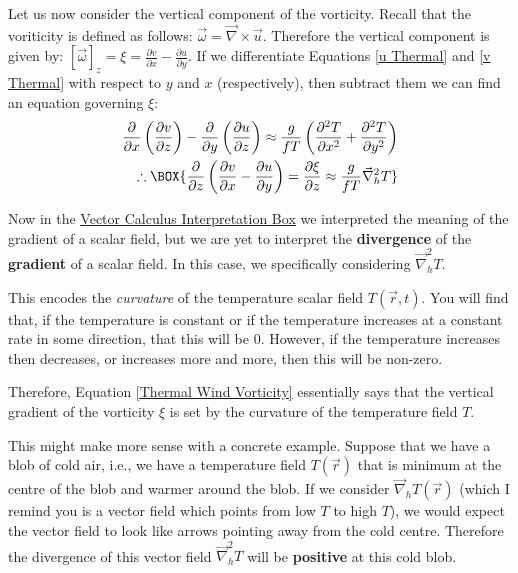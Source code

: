 Let us now consider the vertical component of the vorticity. Recall that the voriticity is defined as follows: $\vec{\omega}=\vec{\nabla}\times\vec{u}$. Therefore the vertical component is given by: $[\vec{\omega}]_z=\xi=\frac{\partial v}{\partial x}-\frac{\partial u}{\partial y}$. If we differentiate Equations \ref{u Thermal} and \ref{v Thermal} with respect to $y$ and $x$ (respectively), then subtract them we can find an equation governing $\xi$:
\begin{align}
    \frac{\partial}{\partial x}\left( \frac{\partial v}{\partial z} \right) - \frac{\partial}{\partial y}\left( \frac{\partial u}{\partial z} \right)
    \approx
    \frac{g}{fT}\left( 
        \frac{\partial^2 T}{\partial x^2}+\frac{\partial^2 T}{\partial y^2}
     \right)\nonumber
     \\
    \label{Thermal Wind Vorticity}
    \therefore
    \BOX{
        \frac{\partial}{\partial z}\left( \frac{\partial v}{\partial x}- \frac{\partial u}{\partial y} \right)=
        \frac{\partial \xi}{\partial z}
        \approx
        \frac{g}{fT}\vec{\nabla}_h^2 T
    }
\end{align}

Now in the \hyperref[VC Interp]{Vector Calculus Interpretation Box} we interpreted the meaning of the gradient of a scalar field, but we are yet to interpret the \textbf{divergence} of the \textbf{gradient} of a scalar field. In this case, we specifically considering $\vec{\nabla}_h^2 T$.

This encodes the \textit{curvature} of the temperature scalar field $T(\vec{r},t)$. You will find that, if the temperature is constant or if the temperature increases at a constant rate in some direction, that this will be $0$. However, if the temperature increases then decreases, or increases more and more, then this will be non-zero.

Therefore, Equation \ref{Thermal Wind Vorticity} essentially says that the vertical gradient of the vorticity $\xi$ is set by the curvature of the temperature field $T$. 

This might make more sense with a concrete example. Suppose that we have a blob of cold air, i.e., we have a temperature field $T(\vec{r})$ that is minimum at the centre of the blob and warmer around the blob. If we consider $\vec{\nabla}_h T(\vec{r})$ (which I remind you is a vector field which points from low $T$ to high $T$), we would expect the vector field to look like arrows pointing away from the cold centre. Therefore the divergence of this vector field $\vec{\nabla}_h^2 T$ will be \textbf{positive} at this cold blob.

